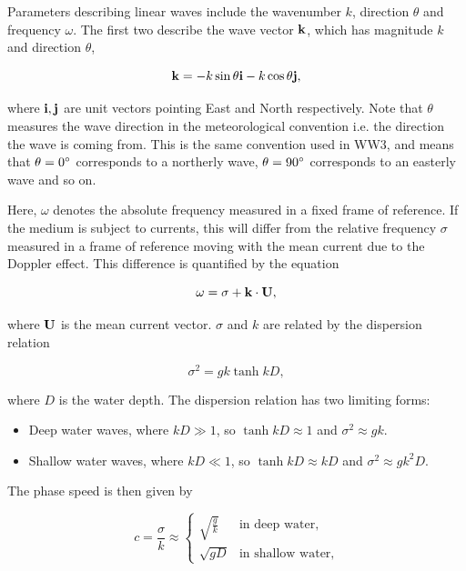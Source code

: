 Parameters describing linear waves include the wavenumber $k$, direction $\theta$ and frequency $\omega$. The first two describe the wave vector $\mathbf{k}$, which has magnitude $k$ and direction $\theta$,

\begin{equation}
\mathbf{k} = - k \sin \theta \mathbf{i} - k \cos \theta \mathbf{j},
\end{equation}

where $\mathbf{i},\mathbf{j}$ are unit vectors pointing East and North respectively. Note that $\theta$ measures the wave direction in the meteorological convention i.e. the direction the wave is coming from. This is the same convention used in WW3, and means that $\theta = 0 ^{\circ}$ corresponds to a northerly wave, $\theta = 90^{\circ}$ corresponds to an easterly wave and so on.

Here, $\omega$ denotes the absolute frequency measured in a fixed frame of reference. If the medium is subject to currents, this will differ from the relative frequency $\sigma$ measured in a frame of reference moving with the mean current due to the Doppler effect. This difference is quantified by the equation

\begin{equation}
    \omega = \sigma + \mathbf{k} \cdot \mathbf{U},
    \label{eqn:doppler}
\end{equation}

where $\mathbf{U}$ is the mean current vector. $\sigma$ and $k$ are related by the dispersion relation

\begin{equation}
    \sigma^2 = gk\tanh{kD},
    \label{eqn:disprel}
\end{equation}

where $D$ is the water depth. The dispersion relation has two limiting forms:

\begin{itemize}
    \item Deep water waves, where $kD \gg 1$, so $\tanh{kD} \approx 1$ and $\sigma^2 \approx gk$.
    \item Shallow water waves, where $kD \ll 1$, so $\tanh{kD} \approx kD$ and $\sigma^2 \approx gk^2D$.
\end{itemize}

The phase speed is then given by

\begin{equation}
c = \frac{\sigma}{k} \approx \begin{cases}
            \sqrt{\frac{g}{k}} &\text{in deep water}, \\
            \sqrt{gD} &\text{in shallow water},
\end{cases}
\label{eqn:pspeed}
\end{equation}

